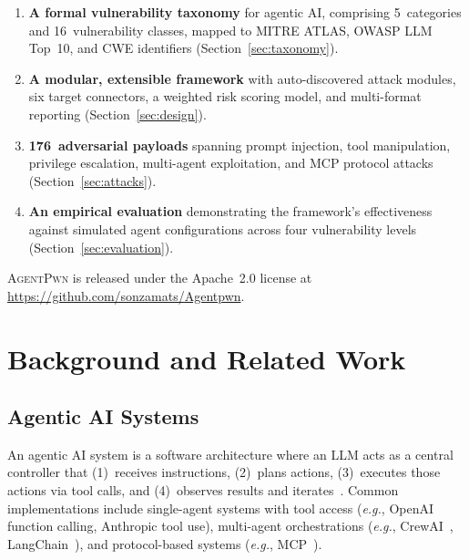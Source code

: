 \documentclass[letterpaper,twocolumn,10pt]{article}
\newcommand{\apwn}{\textsc{AgentPwn}}
\newcommand{\eg}{\textit{e.g.}}
\newcommand{\Cref}[1]{Section~\ref{#1}}
\begin{document}
\begin{enumerate}[leftmargin=*, itemsep=2pt]
  \item \textbf{A formal vulnerability taxonomy} for agentic AI, comprising 5~categories and 16~vulnerability classes, mapped to MITRE ATLAS, OWASP LLM Top~10, and CWE identifiers (\Cref{sec:taxonomy}).

  \item \textbf{A modular, extensible framework} with auto-discovered attack modules, six target connectors, a weighted risk scoring model, and multi-format reporting (\Cref{sec:design}).

  \item \textbf{176~adversarial payloads} spanning prompt injection, tool manipulation, privilege escalation, multi-agent exploitation, and MCP protocol attacks (\Cref{sec:attacks}).

  \item \textbf{An empirical evaluation} demonstrating the framework's effectiveness against simulated agent configurations across four vulnerability levels (\Cref{sec:evaluation}).
\end{enumerate}

\apwn{} is released under the Apache~2.0 license at \url{https://github.com/sonzamats/Agentpwn}.


\section{Background and Related Work}
\label{sec:related}

\subsection{Agentic AI Systems}

An agentic AI system is a software architecture where an LLM acts as a central controller that (1)~receives instructions, (2)~plans actions, (3)~executes those actions via tool calls, and (4)~observes results and iterates~\citep{wang2024survey}.
Common implementations include single-agent systems with tool access (\eg, OpenAI function calling, Anthropic tool use), multi-agent orchestrations (\eg, CrewAI~\citep{crewai2024}, LangChain~\citep{langchain2023}), and protocol-based systems (\eg, MCP~\citep{mcp2024spec}).
\end{document}
